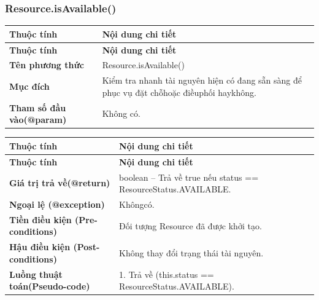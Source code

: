 \subsubsection{Resource.isAvailable()}
\begin{longtable}{|L{0.24\textwidth}|L{0.70\textwidth}|}
\hline
\textbf{Thuộc tính} & \textbf{Nội dung chi tiết} \\
\hline
\endfirsthead
\hline
\textbf{Thuộc tính} & \textbf{Nội dung chi tiết} \\
\hline
\endhead
\textbf{Tên phương thức} & Resource.isAvailable() \\
\hline
\textbf{Mục đích} & Kiểm tra nhanh tài nguyên hiện có đang sẵn sàng để phục vụ đặt chỗ\newline hoặc điềuphối haykhông. \\
\hline
\textbf{Tham số đầu vào}\newline \textbf{(@param)} & Không có. \\
\hline
\end{longtable}
\vspace{-0.5\baselineskip}
\begin{longtable}{|L{0.24\textwidth}|L{0.70\textwidth}|}
\hline
\textbf{Thuộc tính} & \textbf{Nội dung chi tiết} \\
\hline
\endfirsthead
\hline
\textbf{Thuộc tính} & \textbf{Nội dung chi tiết} \\
\hline
\endhead
\textbf{Giá trị trả về(@return)} & boolean – Trả về true nếu status == ResourceStatus.AVAILABLE. \\
\hline
\textbf{Ngoại lệ (@exception)} & Khôngcó. \\
\hline
\textbf{Tiền điều kiện (Pre-}\newline \textbf{conditions)} & Đối tượng Resource đã được khởi tạo. \\
\hline
\textbf{Hậu điều kiện (Post-}\newline \textbf{conditions)} & Không thay đổi trạng thái tài nguyên. \\
\hline
\textbf{Luồng thuật toán}\newline \textbf{(Pseudo-code)} & 1. Trả về (this.status == ResourceStatus.AVAILABLE). \\
\hline
\end{longtable}
\vspace{-0.5\baselineskip}
